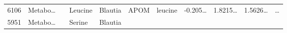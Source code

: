 \documentclass[
]{article}
\begin{document}
\begin{longtable}[]{@{}lllllllllll@{}}
\begin{minipage}[t]{0.03\columnwidth}
6106\strut
\end{minipage} & \begin{minipage}[t]{0.07\columnwidth}\raggedright
Metabo\ldots{}\strut
\end{minipage} & \begin{minipage}[t]{0.07\columnwidth}\raggedright
\strut
\end{minipage} & \begin{minipage}[t]{0.09\columnwidth}\raggedright
Leucine\strut
\end{minipage} & \begin{minipage}[t]{0.07\columnwidth}\raggedright
Blautia\strut
\end{minipage} & \begin{minipage}[t]{0.07\columnwidth}\raggedright
APOM\strut
\end{minipage} & \begin{minipage}[t]{0.09\columnwidth}\raggedright
leucine\strut
\end{minipage} & \begin{minipage}[t]{0.07\columnwidth}\raggedright
-0.205\ldots{}\strut
\end{minipage} & \begin{minipage}[t]{0.07\columnwidth}\raggedright
1.8215\ldots{}\strut
\end{minipage} & \begin{minipage}[t]{0.07\columnwidth}\raggedright
1.5626\ldots{}\strut
\end{minipage} & \begin{minipage}[t]{0.03\columnwidth}\raggedright
\ldots{}\strut
\end{minipage}\tabularnewline
\begin{minipage}[t]{0.03\columnwidth}\raggedright
5951\strut
\end{minipage} & \begin{minipage}[t]{0.07\columnwidth}\raggedright
Metabo\ldots{}\strut
\end{minipage} & \begin{minipage}[t]{0.07\columnwidth}\raggedright
\strut
\end{minipage} & \begin{minipage}[t]{0.09\columnwidth}\raggedright
Serine\strut
\end{minipage} & \begin{minipage}[t]{0.07\columnwidth}\raggedright
Blautia\strut
\end{minipage} & \begin{minipage}[t]{0.07\columnwidth}\raggedright

\end{minipage}
\end{longtable}
\end{document}
